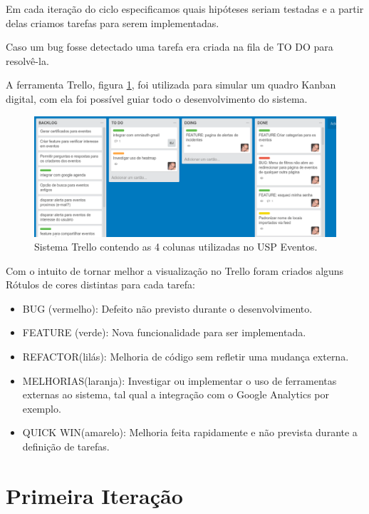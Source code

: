 \par Em cada iteração do ciclo especificamos quais hipóteses seriam testadas e a partir delas criamos tarefas para serem implementadas.
\par Caso um bug fosse detectado uma tarefa era criada na fila de TO DO para resolvê-la.
\par A ferramenta Trello, figura \ref{fig:kanban}, foi utilizada para simular um quadro Kanban digital, com ela foi possível guiar todo o desenvolvimento do sistema.
\begin{figure}[htb]
\includegraphics[width=15cm]{figuras/kanban}
\caption{\label{fig:kanban} Sistema Trello contendo as 4 colunas utilizadas no USP Eventos.}
\end{figure}
        Com o intuito de tornar melhor a visualização no Trello foram criados alguns Rótulos de cores distintas para cada tarefa:
        \begin{itemize}
        \item BUG (vermelho): Defeito não previsto durante o desenvolvimento.
        \item FEATURE (verde): Nova funcionalidade para ser implementada.
        \item REFACTOR(lilás):  Melhoria de código sem refletir uma mudança externa.
        \item MELHORIAS(laranja): Investigar ou implementar o uso de ferramentas externas ao sistema, tal qual a integração com o Google Analytics por exemplo.
        \item QUICK WIN(amarelo): Melhoria feita rapidamente e não prevista durante a definição de tarefas.
        \end{itemize}
\section{Primeira Iteração}
